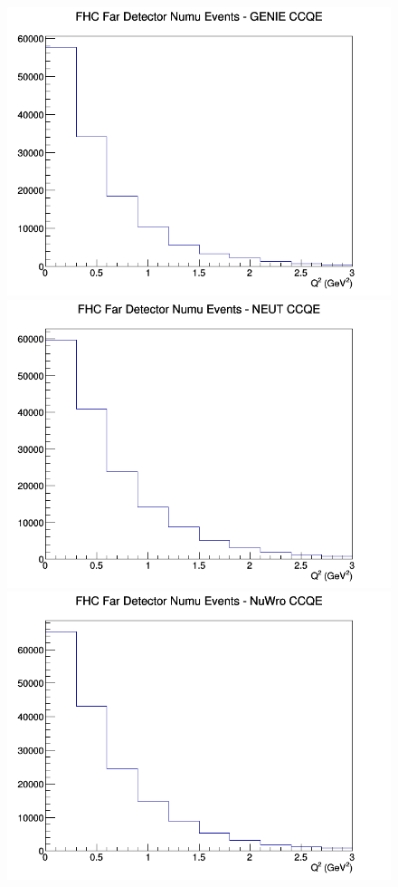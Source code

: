 \documentclass[12pt]{article}
\begin{document}
\begin{figure}[h]
\endminipage
\newline
{}
\includegraphics[width=\linewidth]{Q2/nominal/CCQE_FHC_FD_numu_Q2_GENIE.png}
\endminipage
{}
\includegraphics[width=\linewidth]{Q2/nominal/CCQE_FHC_FD_numu_Q2_NEUT.png}
\endminipage
{}
\includegraphics[width=\linewidth]{Q2/nominal/CCQE_FHC_FD_numu_Q2_NuWro.png}

\end{figure}
\end{document}
